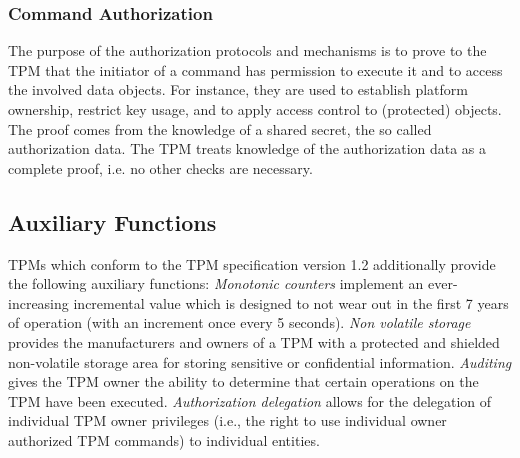 \documentclass[runningheads]{llncs}
\begin{document}
\subsubsection{Command Authorization}
The purpose of the authorization protocols and mechanisms is to prove to the
TPM that the initiator of a command has permission to execute it and to access
the involved data objects. For instance, they are used to establish platform
ownership, restrict key usage, and to apply access control to (protected)
objects. The proof comes from the knowledge of a shared secret, the so called
authorization data. The TPM treats knowledge of the authorization data as a
complete proof, i.e. no other checks are necessary.

%

\subsection{Auxiliary Functions}
TPMs which conform to the TPM specification version 1.2 additionally provide
the following auxiliary functions:
\emph{Monotonic counters} implement an ever-increasing incremental value which
is designed to not wear out in the first 7 years of operation (with an
increment once every 5 seconds).
\emph{Non volatile storage} provides the manufacturers and owners of a TPM
with a protected and shielded non-volatile storage area for storing sensitive
or confidential information.
\emph{Auditing} gives the TPM owner the ability to determine that certain
operations on the TPM have been executed.
\emph{Authorization delegation} allows for the delegation of individual TPM
owner privileges (i.e., the right to use individual owner authorized TPM
commands) to individual entities.
\end{document}

